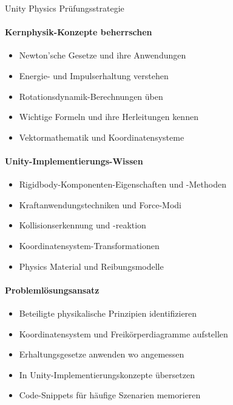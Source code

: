 \begin{KR}{Unity Physics Prüfungsstrategie}\\
    \paragraph{Kernphysik-Konzepte beherrschen}
    \begin{itemize}
        \item Newton'sche Gesetze und ihre Anwendungen
        \item Energie- und Impulserhaltung verstehen
        \item Rotationsdynamik-Berechnungen üben
        \item Wichtige Formeln und ihre Herleitungen kennen
        \item Vektormathematik und Koordinatensysteme
    \end{itemize}
    
    \paragraph{Unity-Implementierungs-Wissen}
    \begin{itemize}
        \item Rigidbody-Komponenten-Eigenschaften und -Methoden
        \item Kraftanwendungstechniken und Force-Modi
        \item Kollisionserkennung und -reaktion
        \item Koordinatensystem-Transformationen
        \item Physics Material und Reibungsmodelle
    \end{itemize}
    
    \paragraph{Problemlösungsansatz}
    \begin{itemize}
        \item Beteiligte physikalische Prinzipien identifizieren
        \item Koordinatensystem und Freikörperdiagramme aufstellen
        \item Erhaltungsgesetze anwenden wo angemessen
        \item In Unity-Implementierungskonzepte übersetzen
        \item Code-Snippets für häufige Szenarien memorieren
    \end{itemize}
    

\end{KR}
